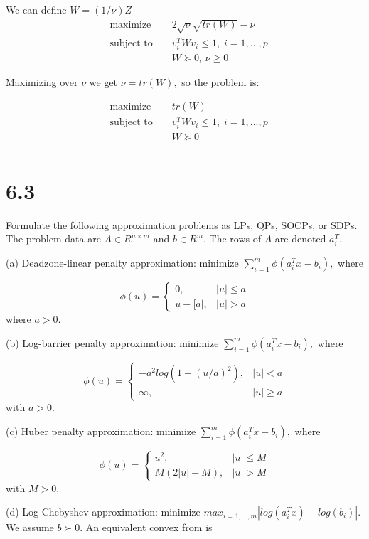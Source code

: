 \documentclass{article}
\begin{document}
We can define $W = (1 / \nu)Z$
\begin{align*}
&\text{maximize } && 2\sqrt{\nu}\sqrt{tr(W)} - \nu \\
&\text{subject to } 
&& v_i^T W v_i \leq 1, 
\; i = 1, ..., p  \\
& &&W \succeq 0, \, \nu \geq 0
\end{align*} 

Maximizing over $\nu$ we get $\nu = tr(W), $
so the problem is:

\begin{align*}
&\text{maximize } && tr(W) \\
&\text{subject to } 
&& v_i^T W v_i \leq 1, 
\; i = 1, ..., p  \\
& &&W \succeq 0\\
\end{align*} 

\section*{6.3}
Formulate the following approximation problems as LPs, QPs, SOCPs, or SDPs. The
problem data are $A \in R^{n \times m}$ and 
$b \in R^m.$ The rows of $A$ are denoted $a_i^T.$

(a) Deadzone-linear penalty approximation: minimize $\sum_{i = 1}^m \phi(a_i^T x - b_i),$ where 

$$
\phi(u) = 
\begin{cases}
0, & |u| \leq a \\
u - [a|, & |u| > a
\end{cases}
$$
where $a > 0.$

(b) Log-barrier penalty approximation: 
minimize $\sum_{i = 1}^m \phi(a_i^T x - b_i),$ where 

$$
\phi(u) = 
\begin{cases}
- a^2 log(1 - (u / a)^2), & |u| < a \\
\infty, & |u| \geq a
\end{cases}
$$
with $a > 0.$

(c) Huber penalty approximation: minimize 
 $\sum_{i = 1}^m \phi(a_i^T x - b_i),$ where 

$$
\phi(u) = 
\begin{cases}
u^2, & |u| \leq M \\
M(2|u| - M), & |u| > M
\end{cases}
$$
with $M > 0.$

(d) Log-Chebyshev approximation: minimize
$max_{i = 1, ..., m} 
|log(a_i^T x) - log(b_i)|.$ We assume 
$b \succ 0.$ An equivalent convex from is
\end{document}
